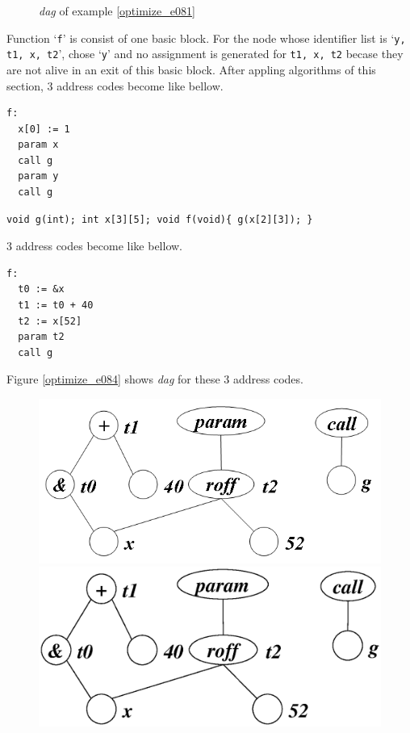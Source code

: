 \begin{Example}
\begin{figure}[htbp]
\begin{center}
\caption{{\em dag} of example \ref{optimize_e081}}
\label{optimize_e082}
\end{center}
\end{figure}
Function `{\tt{f}}' is consist of one basic block.
For the node whose identifier list is `{\tt{y, t1, x, t2}}',
chose `{\tt{y}}' and no assignment is generated for
{\tt{t1, x, t2}} becase they are not alive in an exit
of this basic block.
After appling algorithms of this section,
3 address codes become like bellow.
\begin{verbatim}
f:
  x[0] := 1
  param x
  call g
  param y
  call g
\end{verbatim}
\end{Example}

\begin{Example}
\label{optimize_e083}
\begin{verbatim}
void g(int); int x[3][5]; void f(void){ g(x[2][3]); }
\end{verbatim}
3 address codes become like bellow.
\begin{verbatim}
f:
  t0 := &x
  t1 := t0 + 40
  t2 := x[52]
  param t2
  call g
\end{verbatim}
Figure \ref{optimize_e084} shows {\em dag} for these 3 address codes.
\begin{figure}[htbp]
\begin{center}
\begin{htmlonly}
\includegraphics[width=1.0\linewidth,height=0.509\linewidth]{opt035.png}
\end{htmlonly}
\begin{latexonly}
\includegraphics[width=1.0\linewidth,height=0.509\linewidth]{opt035.eps}

\end{latexonly}
\end{center}
\end{figure}
\end{Example}
